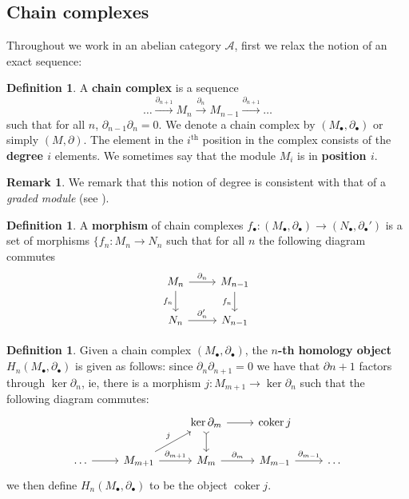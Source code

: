 \documentclass[12pt]{article}
\theoremstyle{plain}
\theoremstyle{definition}
\newtheorem{defn}[thm]{Definition} %
\newtheorem{remark}[thm]{Remark}
\newcommand{\scr}[1]{\mathscr{#1}}
\newcommand{\lto}{\longrightarrow}
\begin{document}
\subsection{Chain complexes}
Throughout we work in an abelian category $\scr{A}$, first we relax the notion of an exact sequence:
\begin{defn}
A \textbf{chain complex} is a sequence
\begin{equation}
\hdots \stackrel{\partial_{n+1}}{\lto} M_n \stackrel{\partial_{n}}{\lto} M_{n-1} \stackrel{\partial_{n+1}}{\lto} \hdots
\end{equation}
such that for all $n$, $\partial_{n-1}\partial_n = 0$. We denote a chain complex by $(M_\bullet,\partial_\bullet)$ or simply $(M,\partial)$. The element in the $i^{\text{th}}$ position in the complex consists of the \textbf{degree $i$} elements. We sometimes say that the module $M_i$ is in \textbf{position $i$}.
\end{defn}
\begin{remark}
We remark that this notion of degree is consistent with that of a \emph{graded module} (see \cite{ComAlg}).
\end{remark}
\begin{defn}
A \textbf{morphism} of chain complexes $f_\bullet: (M_\bullet,\partial_\bullet) \lto (N_\bullet, \partial_\bullet')$ is a set of morphisms $\lbrace f_n: M_n \lto N_n$ such that for all $n$ the following diagram commutes
\begin{equation}
\begin{tikzcd}
M_n\arrow[r,"{\partial_{n}}"]\arrow[d,swap,"{f_n}"] & M_{n-1}\arrow[d,swap,"{f_n}"]\\
N_n\arrow[r,"{\partial_n'}"] & N_{n-1}
\end{tikzcd}
\end{equation}
\end{defn}
\begin{defn}
Given a chain complex $(M_\bullet, \partial_\bullet)$, the \textbf{$n$-th homology object} $H_n(M_\bullet,\partial_\bullet)$ is given as follows: since $\partial_{n}\partial_{n+1} = 0$ we have that $\partial{n+1}$ factors through $\operatorname{ker}\partial_n$, ie, there is a morphism $j: M_{m+1} \lto \operatorname{ker}\partial_n$ such that the following diagram commutes:
\begin{equation}
\begin{tikzcd}
& & \operatorname{ker}\partial_{m}\arrow[d,rightarrowtail]\arrow[r] & \operatorname{coker}j\\
\hdots\arrow[r] & M_{m+1}\arrow[r,"{\partial_{m+1}}"]\arrow[ur,"{j}"] & M_m\arrow[r,"{\partial_m}"] & M_{m-1}\arrow[r,"{\partial_{m-1}}"] & \hdots
\end{tikzcd}
\end{equation}
we then define $H_n(M_\bullet,\partial_\bullet)$ to be the object $\operatorname{coker}j$.
\end{defn}
\end{document}
